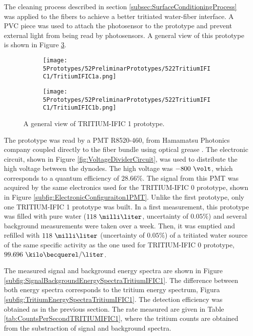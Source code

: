 The cleaning process described in section \ref{subsec:SurfaceConditioningProcess} was applied to the fibers to achieve a better tritiated water-fiber interface. A PVC piece was used to attach the photosensor to the prototype and prevent external light from being read by photosensors. A general view of this prototype is shown in Figure \ref{fig:TritumIFIC1}.

\begin{figure}
\centering
    \begin{subfigure}[b]{0.40\textwidth}
    \centering
    \texttt{[image: 5Prototypes/52PreliminarPrototypes/522TritiumIFIC1/TritiumIFIC1a.png]}  
    \caption{\label{subfig:TritumIFIC1a}}
    \end{subfigure}
    \hfill
    \begin{subfigure}[b]{0.40\textwidth}
    \centering
    \texttt{[image: 5Prototypes/52PreliminarPrototypes/522TritiumIFIC1/TritiumIFIC1b.png]}  
    \caption{\label{subfig:TritumIFIC1b}}
    \end{subfigure}
 \caption{A general view of TRITIUM-IFIC 1 prototype.}
 \label{fig:TritumIFIC1}
\end{figure}

The prototype was read by a PMT R8520-460, from Hamamatsu Photonics company \cite{DataSheetPMTs} coupled directly to the fiber bundle using optical grease \cite{OpticalGrease}. The electronic circuit, shown in Figure \ref{fig:VoltageDividerCircuit}, was used to distribute the high voltage between the dynodes. The high voltage was $-800~\volt$, which corresponds to a quantum efficiency of $28.66\%$. The signal from this PMT was acquired by the same electronics used for the TRITIUM-IFIC 0 prototype, shown in Figure \ref{subfig:ElectronicConfiguraiton1PMT}. Unlike the first prototype, only one TRITIUM-IFIC 1 prototype was built. In a first measurement, this prototype was filled with pure water ($118~\milli\liter$, uncertainty of $0.05\%$) and several background measurements were taken over a week. Then, it was emptied and refilled with $118~\milli\liter$ (uncertainty of $0.05\%$) of a tritiated water source of the same specific activity as the one used for TRITIUM-IFIC 0 prototype, $99.696~\kilo\becquerel/\liter$. 

The measured signal and background energy spectra are shown in Figure \ref{subfig:SignalBackgroundEnergySpectraTritiumIFIC1}. The difference between both energy spectra corresponds to the tritium energy spectrum, Figura \ref{subfig:TritiumEnergySpectraTritiumIFIC1}. The detection efficiency was obtained as in the previous section. The rate measured are given in Table \ref{tab:CountsPerSecondTRITIUMIFIC1}, where the tritium counts are obtained from the substraction of signal and background spectra.

